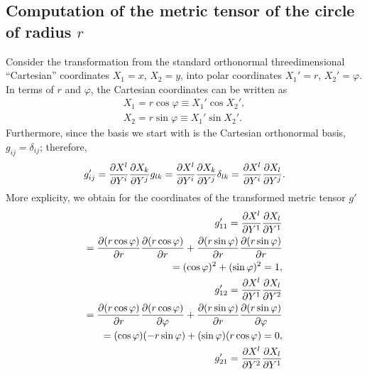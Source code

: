 {
\color{blue}
\bexample

\subsection*{Computation of the metric tensor of the circle of radius $r$}
Consider the transformation from the standard orthonormal
threedimensional ``Cartesian'' coordinates
$X_1=x$,
$X_2=y$,
into polar coordinates
$X_1'=r$,
$X_2'=\varphi$.
In terms of  $r$ and $\varphi$, the Cartesian coordinates can be written as
\begin{equation}
\begin{split}
 X_1=r \cos \varphi \equiv X_1' \cos X_2'  , \\
 X_2=r \sin \varphi \equiv X_1'\sin X_2'  .
\end{split}
\end{equation}
Furthermore,  since the basis we start with is the Cartesian orthonormal basis,
$g_{ij}=\delta_{ij}$; therefore,
\begin{equation}
g'_{ij}= {\partial {X}^l\over \partial { Y }^i}{\partial {X}_k\over \partial { Y }^j} g_{lk}
= {\partial {X}^l\over \partial { Y }^i}{\partial {X}_k\over \partial { Y }^j} \delta_{lk}
= {\partial {X}^l\over \partial { Y }^i}{\partial {X}_l\over \partial { Y }^j}.
\end{equation}
More explicity, we obtain for the coordinates of the transformed metric tensor $g'$
\begin{equation}
\begin{split}
g'_{11}
= {\partial {X}^l\over \partial { Y }^1}{\partial {X}_l\over \partial { Y }^1} \\
=
{\partial (r \cos \varphi) \over \partial {r}}{\partial (r \cos \varphi) \over \partial {r}}
+
{\partial (r \sin \varphi) \over \partial {r}}{\partial (r \sin \varphi) \over \partial {r}}       \\
=
( \cos \varphi )^2
+
(\sin \varphi )^2 =1,\\
g'_{12}
= {\partial {X}^l\over \partial { Y }^1}{\partial {X}_l\over \partial { Y }^2} \\
=
{\partial (r \cos \varphi) \over \partial {r}}{\partial (r \cos \varphi) \over \partial {\varphi }}
+
{\partial (r \sin \varphi) \over \partial {r}}{\partial (r \sin \varphi) \over \partial {\varphi }}  \\
=
(\cos \varphi ) (- r \sin \varphi )
+
(\sin \varphi )( r \cos \varphi )  =0,\\
g'_{21}
= {\partial {X}^l\over \partial { Y }^2}{\partial {X}_l\over \partial { Y }^1} \\

\end{split}
\end{equation}}
